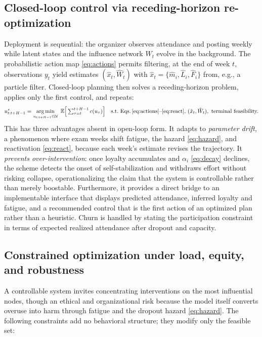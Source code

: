 \documentclass[11pt]{article}
\DeclareMathOperator*{\argmin}{arg\,min}
\begin{document}
\subsection{Closed-loop control via receding-horizon re-optimization}
Deployment is sequential: the organizer observes attendance and posting weekly while latent states and the influence network $W_t$ evolve in the background. The probabilistic action map \eqref{eq:actions} permits filtering, at the end of week $t$, observations $y_t$ yield estimates $(\hat x_t,\hat W_t)$ with $\hat x_t=\{\hat m_i,\hat L_i,\hat F_i\}$ from, e.g., a particle filter. Closed-loop planning then solves a receding-horizon problem, applies only the first control, and repeats:
\begin{equation*}
u^\star_{t:t+H-1}=\argmin_{u_{t:t+H-1}\in\mathcal U}\ \mathbb{E}\Big[\textstyle\sum_{\tau=t}^{t+H-1}c(u_\tau)\Big]
\quad\text{s.t.\ Eqs.\,\eqref{eq:actions}--\eqref{eq:react},}\ (\hat x_t,\hat W_t),\ \text{terminal feasibility.}
\end{equation*}
This has three advantages absent in open-loop form. It adapts to \emph{parameter drift}, a phenomenon where exam weeks shift fatigue, the hazard \eqref{eq:hazard}, and reactivation \eqref{eq:react}, because each week's estimate revises the trajectory. It \emph{prevents over-intervention}: once loyalty accumulates and $\alpha_i$ \eqref{eq:decay} declines, the scheme detects the onset of self-stabilization and withdraws effort without risking collapse, operationalizing the claim that the system is controllable rather than merely boostable. Furthermore, it provides a direct bridge to an implementable interface that displays predicted attendance, inferred loyalty and fatigue, and a recommended control that is the first action of an optimized plan rather than a heuristic. Churn is handled by stating the participation constraint in terms of expected realized attendance after dropout and capacity.

\subsection{Constrained optimization under load, equity, and robustness}
A controllable system invites concentrating interventions on the most influential nodes, though an ethical and organizational risk because the model itself converts overuse into harm through fatigue and the dropout hazard \eqref{eq:hazard}. The following constraints add no behavioral structure; they modify only the feasible set:
\end{document}
